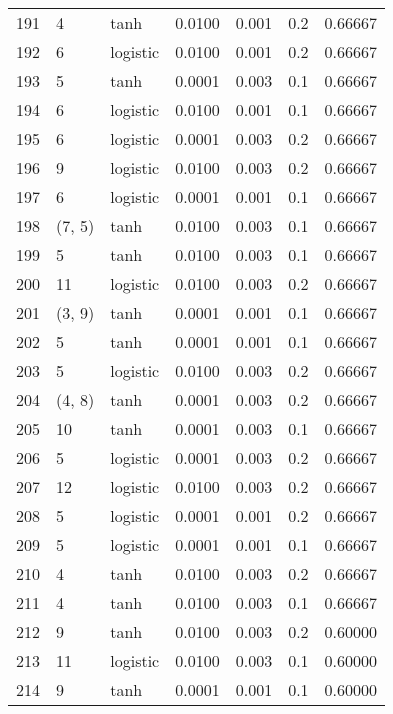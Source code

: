 \begin{tabular}{lllrrrr}
191 &           4 &      tanh &  0.0100 &  0.001 &  0.2 &   0.66667 \\
192 &           6 &  logistic &  0.0100 &  0.001 &  0.2 &   0.66667 \\
193 &           5 &      tanh &  0.0001 &  0.003 &  0.1 &   0.66667 \\
194 &           6 &  logistic &  0.0100 &  0.001 &  0.1 &   0.66667 \\
195 &           6 &  logistic &  0.0001 &  0.003 &  0.2 &   0.66667 \\
196 &           9 &  logistic &  0.0100 &  0.003 &  0.2 &   0.66667 \\
197 &           6 &  logistic &  0.0001 &  0.001 &  0.1 &   0.66667 \\
198 &      (7, 5) &      tanh &  0.0100 &  0.003 &  0.1 &   0.66667 \\
199 &           5 &      tanh &  0.0100 &  0.003 &  0.1 &   0.66667 \\
200 &          11 &  logistic &  0.0100 &  0.003 &  0.2 &   0.66667 \\
201 &      (3, 9) &      tanh &  0.0001 &  0.001 &  0.1 &   0.66667 \\
202 &           5 &      tanh &  0.0001 &  0.001 &  0.1 &   0.66667 \\
203 &           5 &  logistic &  0.0100 &  0.003 &  0.2 &   0.66667 \\
204 &      (4, 8) &      tanh &  0.0001 &  0.003 &  0.2 &   0.66667 \\
205 &          10 &      tanh &  0.0001 &  0.003 &  0.1 &   0.66667 \\
206 &           5 &  logistic &  0.0001 &  0.003 &  0.2 &   0.66667 \\
207 &          12 &  logistic &  0.0100 &  0.003 &  0.2 &   0.66667 \\
208 &           5 &  logistic &  0.0001 &  0.001 &  0.2 &   0.66667 \\
209 &           5 &  logistic &  0.0001 &  0.001 &  0.1 &   0.66667 \\
210 &           4 &      tanh &  0.0100 &  0.003 &  0.2 &   0.66667 \\
211 &           4 &      tanh &  0.0100 &  0.003 &  0.1 &   0.66667 \\
212 &           9 &      tanh &  0.0100 &  0.003 &  0.2 &   0.60000 \\
213 &          11 &  logistic &  0.0100 &  0.003 &  0.1 &   0.60000 \\
214 &           9 &      tanh &  0.0001 &  0.001 &  0.1 &   0.60000 \\

\end{tabular}
